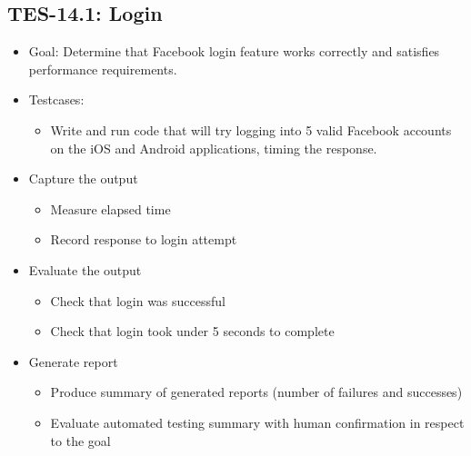 \subsection{TES-14.1: Login}
\begin{itemize}
\item Goal: Determine that Facebook login feature works correctly and 
satisfies performance requirements.

\item Testcases: 
\begin{itemize}
\item Write and run code that will try logging into 5 valid Facebook accounts 
on the iOS and Android applications, timing the response.
\end{itemize}

\item Capture the output 
\begin{itemize}
\item Measure elapsed time 
\item Record response to login attempt
\end{itemize}

\item Evaluate the output
\begin{itemize}
\item Check that login was successful
\item Check that login took under 5 seconds to complete
\end{itemize}

\item Generate report 
\begin{itemize}
\item Produce summary of generated reports (number of failures and successes)
\item Evaluate automated testing summary with human confirmation in respect to the goal
\end{itemize}
\end{itemize}

